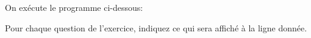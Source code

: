 
On exécute le programme ci-dessous:


Pour chaque question de l'exercice, indiquez ce qui sera affiché à la
ligne donnée.\\
